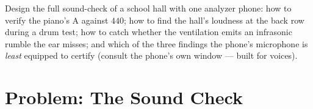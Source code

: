 \begin{exercise}[$\star\star\star$]\label{exo:g8:sound-pitch-loudness:12}
Design the full sound-check of a school hall with one
analyzer phone: how to verify the piano's A against $440$;
how to find the hall's loudness at the back row during a
drum test; how to catch whether the ventilation emits an
infrasonic rumble the ear misses; and which of the three
findings the phone's microphone is \emph{least} equipped to
certify (consult the phone's own  window --- built
for voices).
\end{exercise}

\section{Problem: The Sound Check}

